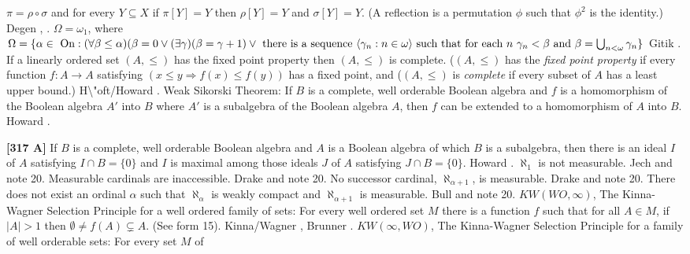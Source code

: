 $\pi =\rho\circ\sigma$ and for every $Y\subseteq X$ if $\pi[Y]=Y$
then $\rho[Y]=Y$ and $\sigma[Y]=Y$.  (A reflection is a permutation
$\phi$ such that $\phi^2$ is the identity.) \ac{Degen} \cite{1988},
\cite{2000}.
\medskip
{} $\Omega = \omega_1$, where  $\Omega =
\{\alpha\in\hbox{ On}: (\forall\beta\le\alpha)(\beta=0\vee
(\exists\gamma)(\beta=\gamma+1)\vee\hbox{ there is a sequence }
\langle\gamma_n: n\in\omega\rangle\hbox{ such that for each }n\
\gamma_n<\beta\hbox{ and } \beta=\bigcup_{n<\omega}\gamma_n\}$
\ac{Gitik} \cite{1980}.
\medskip
{} If a linearly ordered set $(A,\le)$ has the fixed
point property then $(A,\le)$ is complete. ($(A,\le)$  has the {\it fixed
point property} if every function $f:A\to A$ satisfying $(x\le y
\Rightarrow f(x)\le f(y))$ has a fixed point, and ($(A,\le)$ is
{\it complete} if every subset of $A$ has a least upper bound.)
\ac{H\"oft/Howard} \cite{1994}.
\medskip
{} Weak Sikorski Theorem:  If $B$ is a complete,
well orderable Boolean algebra and $f$ is a homomorphism of the Boolean
algebra $A'$ into $B$ where $A'$ is a subalgebra of the Boolean algebra
$A$, then $f$ can be extended to a homomorphism of $A$ into $B$.
\ac{Howard} \cite{1973}. \iput{Sikorski's extension theorem}
\smallskip
\item{}{\bf [317 A]} If $B$ is a complete, well orderable Boolean algebra
and $A$ is a Boolean algebra of which $B$ is a subalgebra, then there is
an ideal $I$ of $A$ satisfying $I\cap B=\{0\}$ and $I$ is maximal among
those ideals $J$ of $A$ satisfying $J \cap B = \{0\}$.  \ac{Howard}
\cite{1973}.
\medskip
{} $\aleph_1$ is not measurable.
\ac{Jech} \cite{1968a} and note 20.
\medskip
{} Measurable cardinals are inaccessible. \ac{Drake}
\cite{1974} and note 20.
\medskip
{} No successor cardinal, $\aleph_{\alpha+1}$, is
measurable. \ac{Drake} \cite{1974} and note 20.
\medskip
{} There does not exist an ordinal
$\alpha$ such that $\aleph_{\alpha}$ is weakly compact and
$\aleph_{\alpha+1}$ is measurable. \ac{Bull} \cite{1978} and note 20.
\medskip
{} $KW(WO,\infty)$, The Kinna-Wagner Selection
Principle for a well ordered family of sets: For every  well ordered set
$M$ there is a function $f$ such that for all $A\in M$, if $|A|>1$ then
$\emptyset\neq f(A)\subsetneq A$.  (See form 15).
\ac{Kinna/Wagner} \cite{1955}, \ac{Brunner} \cite{1982a}.
\medskip
{} $KW(\infty,WO)$, The Kinna-Wagner Selection
Principle for a family of well orderable sets: For every set $M$ of
